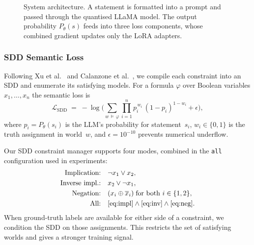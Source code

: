\documentclass[11pt,a4paper]{article}
\newcommand{\SL}{\mathcal{L}_{\text{SDD}}}
\begin{document}
\begin{figure}[H]
{%
}
\caption{System architecture.  A statement is formatted into a prompt and
  passed through the quantised LLaMA model.  The output probability
  $P_\theta(s)$ feeds into three loss components, whose combined gradient
  updates only the LoRA adapters.}
\label{fig:arch}
\end{figure}

\subsubsection{SDD Semantic Loss}

Following Xu et al.~\cite{xu2018semantic} and Calanzone et
al.~\cite{calanzone2025loco}, we compile each constraint into an SDD and
enumerate its satisfying models.  For a formula $\varphi$ over Boolean
variables $x_1, \dots, x_n$ the semantic loss is
\begin{equation}\label{eq:sdd}
  \SL \;=\; -\log\!\Biggl(
    \sum_{w \,\models\, \varphi}
    \prod_{i=1}^{n} p_i^{\,w_i}\,(1-p_i)^{1-w_i}
    + \epsilon
  \Biggr),
\end{equation}
where $p_i = P_\theta(s_i)$ is the LLM's probability for statement~$s_i$,
$w_i \in \{0,1\}$ is the truth assignment in world~$w$, and
$\epsilon = 10^{-10}$ prevents numerical underflow.

Our SDD constraint manager supports four modes, combined in the
\texttt{all} configuration used in experiments:
\begin{align}
  \text{Implication:}  \quad & \neg x_1 \lor x_2, \label{eq:impl}\\
  \text{Inverse impl.:}\quad & x_2 \lor \neg x_1, \label{eq:inv}\\
  \text{Negation:}     \quad & (x_i \oplus \overline{x}_i)
                               \;\text{for both } i \in \{1,2\}, \label{eq:neg}\\
  \text{All:}          \quad & \eqref{eq:impl} \land \eqref{eq:inv}
                               \land \eqref{eq:neg}. \label{eq:all}
\end{align}
When ground-truth labels are available for either side of a constraint, we
condition the SDD on those assignments.  This restricts the set of
satisfying worlds and gives a stronger training signal.
\end{document}
